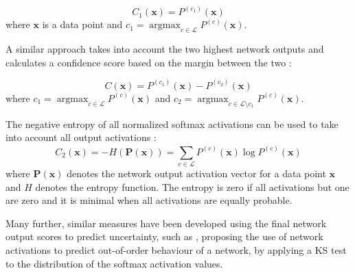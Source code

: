 \documentclass[10pt]{article}
\DeclareMathOperator{\argmax}{argmax}
\begin{document}
\begin{equation}
	\label{eq:net_msr}
    C_1(\mathbf{x})=P^{(c_1)}(\mathbf{x})
\end{equation}
where $\mathbf{x}$ is a data point and $c_1=\argmax_{c\in\mathcal{L}}P^{(c)}(\mathbf{x})$.

A similar approach takes into account the two highest network outputs and calculates a confidence score based on the margin between the two \cite{ouerghemmi_two-step_2017, mandelbaum17}:

\begin{equation}
	\label{eq:net_margin}
    C(\mathbf{x})=P^{(c_1)}(\mathbf{x})-P^{(c_2)}(\mathbf{x})
\end{equation}
where $c_1=\argmax_{c\in\mathcal{L}}P^{(c)}(\mathbf{x})$ and $c_2=\argmax_{c\in\mathcal{L}\setminus c_1}P^{(c)}(\mathbf{x})$.

The negative entropy of all normalized softmax activations can be used to take into account all output activations \cite{zaragoza}:
\begin{equation}
    \label{eq:net_entropy}
    C_2(\mathbf{x}) = -H(\mathbf{P(\mathbf{x})}) = \sum_{c\in \mathcal{L}}^{}P^{(c)}(\mathbf{x})\log P^{(c)}(\mathbf{x})
\end{equation}
where $\mathbf{\mathbf{P(x)}}$ denotes the network output activation vector for a data point $\mathbf{x}$ and $H$ denotes the entropy function. The entropy is zero if all activations but one are zero and it is minimal when all activations are equally probable.

Many further, similar measures have been developed using the final network output scores to predict uncertainty, such as \textcite{Sun2018KSconfA}, proposing the use of network activations to predict out-of-order behaviour of a network, by applying a \gls{KS} test to the distribution of the softmax activation values.
\end{document}
